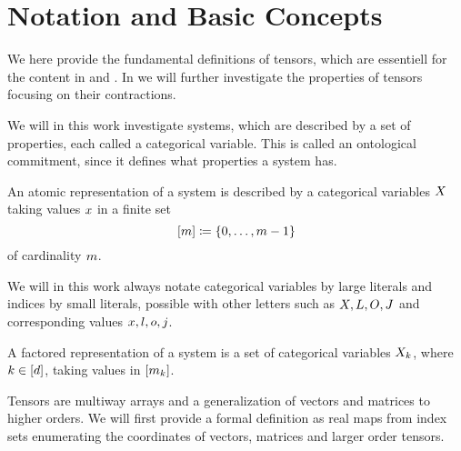 \chapter{Notation and Basic Concepts}\label{cha:TensorNetworks}

We here provide the fundamental definitions of tensors, which are essentiell for the content in  and .
In  we will further investigate the properties of tensors focusing on their contractions.


We will in this work investigate systems, which are described by a set of properties, each called a categorical variable.
This is called an ontological commitment, since it defines what properties a system has.

\begin{definition}
	An atomic representation of a system is described by a categorical variables $X$ taking values $x$ in a finite set
		\[  [m]\coloneqq \{0,\ldots, m-1\} \]
	of cardinality $m$.
\end{definition}

We will in this work always notate categorical variables by large literals and indices by small literals, possible with other letters such as $X,L,O,J$ and corresponding values $x,l,o,j$.

\begin{definition}
	A factored representation of a system is a set of categorical variables $X_{k}$, where $k\in[d]$, taking values in $[m_{k}]$.
\end{definition}


Tensors are multiway arrays and a generalization of vectors and matrices to higher orders.
We will first provide a formal definition as real maps from index sets enumerating the coordinates of vectors, matrices and larger order tensors.

